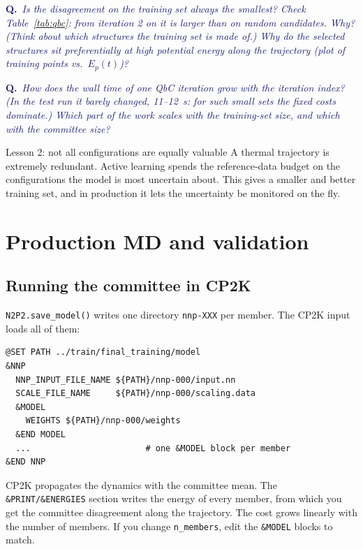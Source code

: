 \documentclass[11pt,a4paper]{article}
\newcommand{\question}[1]{\par\smallskip\noindent\textcolor{MidnightBlue}{\textbf{Q.}~\emph{#1}}\par\smallskip}
\begin{document}
\question{Is the disagreement on the training set always the smallest? Check
Table~\ref{tab:qbc}: from iteration 2 on it is \emph{larger} than on random
candidates. Why? (Think about which structures the training set is made of.)
Why do the selected structures sit preferentially at \emph{high} potential
energy along the trajectory (plot of training points vs.\ $E_p(t)$)?}

\question{How does the wall time of one QbC iteration grow with the iteration
index? (In the test run it barely changed, 11--\SI{12}{s}: for such small sets
the fixed costs dominate.) Which part of the work scales with the training-set size, and which
with the committee size?}

\begin{keybox}{Lesson 2: not all configurations are equally valuable}
A thermal trajectory is extremely redundant. Active learning spends the
reference-data budget on the configurations the model is most uncertain about.
This gives a smaller and better training set, and in production it lets the
uncertainty be monitored on the fly.
\end{keybox}

\section{Production MD and validation}

\subsection{Running the committee in CP2K}
\texttt{N2P2.save\_model()} writes one directory \texttt{nnp-XXX} per member.
The CP2K input loads all of them:
\begin{lstlisting}
@SET PATH ../train/final_training/model
&NNP
  NNP_INPUT_FILE_NAME ${PATH}/nnp-000/input.nn
  SCALE_FILE_NAME     ${PATH}/nnp-000/scaling.data
  &MODEL
    WEIGHTS ${PATH}/nnp-000/weights
  &END MODEL
  ...                       # one &MODEL block per member
&END NNP
\end{lstlisting}
CP2K propagates the dynamics with the committee mean. The
\texttt{\&PRINT/\&ENERGIES} section writes the energy of every member, from
which you get the committee disagreement along the trajectory. The cost grows linearly with the number
of members. If you change \texttt{n\_members}, edit the \texttt{\&MODEL}
blocks to match.
\end{document}
